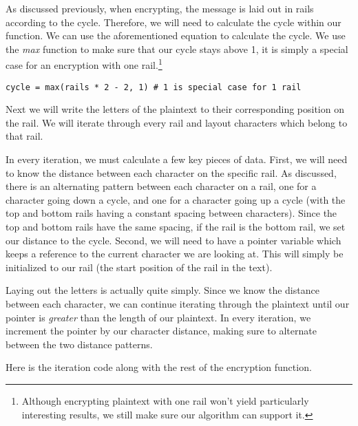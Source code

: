As discussed previously, when encrypting, the message is laid out in rails according to the cycle. 
Therefore, we will need to calculate the cycle within our function. 
We can use the aforementioned equation to calculate the cycle. We use the \textit{max} function to 
make sure that our cycle stays above 1, it is simply a special case for an encryption with one rail.\footnote{Although 
encrypting plaintext with one rail won't yield particularly interesting results, we still make sure our algorithm can support it.}

\begin{verbatim}
cycle = max(rails * 2 - 2, 1) # 1 is special case for 1 rail    
\end{verbatim}

Next we will write the letters of the plaintext to their corresponding position on the rail. 
We will iterate through every rail and layout characters which belong to that rail. 

In every iteration, we must calculate a few key pieces of data. First, we will need to know the distance between 
each character on the specific rail. As discussed, there is an alternating pattern between each character on a rail,
one for a character going down a cycle, and one for a character going up a cycle (with the top and bottom rails
having a constant spacing between characters). Since the top and bottom rails have the same spacing, if the rail
is the bottom rail, we set our distance to the cycle. Second, we will need to have a pointer variable which
keeps a reference to the current character we are looking at. This will simply be initialized to our rail (the start position
of the rail in the text). 

Laying out the letters is actually quite simply. Since we know the distance between each character, we can continue
iterating through the plaintext until our pointer is \textit{greater} than the length of our plaintext. In every iteration,
we increment the pointer by our character distance, making sure to alternate between the two distance patterns. 

Here is the iteration code along with the rest of the encryption function.

